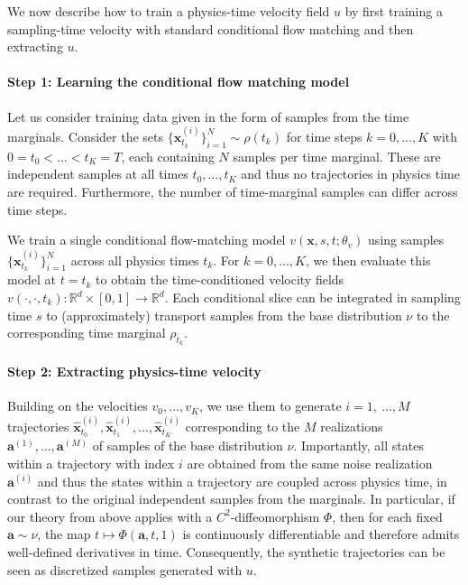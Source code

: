 \documentclass{article}
\newcommand{\bfx}{\boldsymbol{x}}
\newcommand{\bfa}{\boldsymbol{a}}
\theoremstyle{definition}
\theoremstyle{plain}
\theoremstyle{definition}
\theoremstyle{remark}
\begin{document}
We now describe how to train a physics-time velocity field $u$ by first training a sampling-time velocity with standard conditional flow matching and then extracting $u$. 


\paragraph{Step 1: Learning the conditional flow matching model}

Let us consider training data given in the form of samples from the time marginals. Consider the sets $\{\bfx_{t_k}^{(i)}\}_{i = 1}^N \sim \rho({t_k})$ for time steps $k = 0, \dots, K$ with $0 = t_0 < \dots < t_K = T$, each containing $N$ samples per time marginal. These are independent samples at all times $t_0, \dots, t_K$ and thus no trajectories in physics time are required. Furthermore, the number of time-marginal samples can differ across time steps.


We train a single conditional flow-matching model $v(\bfx,s,t;\theta_v)$ using samples $\{\bfx_{t_k}^{(i)}\}_{i = 1}^N$ across all physics times $t_k$. For $k = 0, \dots, K$, we then evaluate this model at $t = t_k$ to obtain the time-conditioned velocity fields $v(\cdot,\cdot,t_k) : \mathbb{R}^d \times [0,1] \to \mathbb{R}^d$. Each conditional slice can be integrated in sampling time $s$ to (approximately) transport samples from the base distribution $\nu$ to the corresponding time marginal $\rho_{t_k}$.



\paragraph{Step 2: Extracting physics-time velocity}

Building on the velocities $v_0, \dots, v_K$, we use them to generate $i = 1,\ \dots, M$ trajectories $\hat{\bfx}_{t_0}^{(i)}, \hat{\bfx}_{t_1}^{(i)}, \dots, \hat{\bfx}_{t_{K}}^{(i)}$ corresponding to the $M$ realizations $\bfa^{(1)}, \dots, \bfa^{(M)}$ of samples of the base distribution $\nu$. Importantly, all states within a trajectory with index $i$ are obtained from the same noise realization $\bfa^{(i)}$ and thus the states within a trajectory are coupled across physics time, in contrast to the original independent samples from the marginals.  In particular, if our theory from above applies with a $C^2$-diffeomorphism $\Phi$, then for each fixed $\bfa \sim \nu$, the map $t \mapsto \Phi(\bfa, t, 1)$ is continuously differentiable  and therefore admits well-defined derivatives in time. Consequently, the synthetic trajectories can be seen as discretized samples generated with $u$. 
\end{document}
